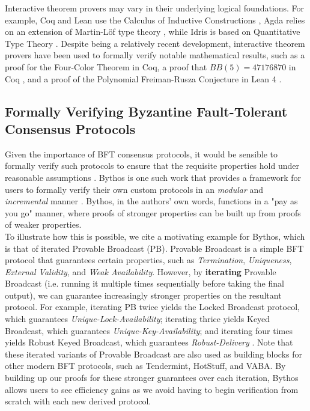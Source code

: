 Interactive theorem provers may vary in their underlying logical foundations. For example, Coq and Lean use the Calculus of Inductive Constructions \cite{coq, lean4}, Agda relies on an extension of Martin-Löf type theory \cite{agda}, while Idris is based on Quantitative Type Theory \cite{idris2}. Despite being a relatively recent development, interactive theorem provers have been used to formally verify notable mathematical results, such as a proof for the Four-Color Theorem \cite{4color} in Coq, a proof that $BB(5) = 47176870$ in Coq \cite{busybeaver}, and a proof of the Polynomial Freiman-Rusza Conjecture in Lean 4 \cite{pfr-lean}.
\\

\subsection{Formally Verifying Byzantine Fault-Tolerant Consensus Protocols}

Given the importance of BFT consensus protocols, it would be sensible to formally verify such protocols to ensure that the requisite properties hold under reasonable assumptions \cite{dsbugs}. Bythos is one such work that provides a framework for users to formally verify their own custom protocols in an \textit{modular} and \textit{incremental} manner \cite{bythos}. Bythos, in the authors' own words, functions in a "pay as you go" manner, where proofs of stronger properties can be built up from proofs of weaker properties. 
\\

To illustrate how this is possible, we cite a motivating example for Bythos, which is that of iterated Provable Broadcast (PB). Provable Broadcast is a simple BFT protocol that guarantees certain properties, such as \textit{Termination}, \textit{Uniqueness}, \textit{External Validity}, and \textit{Weak Availability}. However, by \textbf{iterating} Provable Broadcast (i.e. running it multiple times sequentially before taking the final output), we can guarantee increasingly stronger properties on the resultant protocol. For example, iterating PB twice yields the Locked Broadcast protocol, which guarantees \textit{Unique-Lock-Availability}; iterating thrice yields Keyed Broadcast, which guarantees \textit{Unique-Key-Availability}; and iterating four times yields Robust Keyed Broadcast, which guarantees \textit{Robust-Delivery} \cite{pb}. Note that these iterated variants of Provable Broadcast are also used as building blocks for other modern BFT protocols, such as Tendermint, HotStuff, and VABA. By building up our proofs for these stronger guarantees over each iteration, Bythos allows users to see efficiency gains as we avoid having to begin verification from scratch with each new derived protocol.
\\

